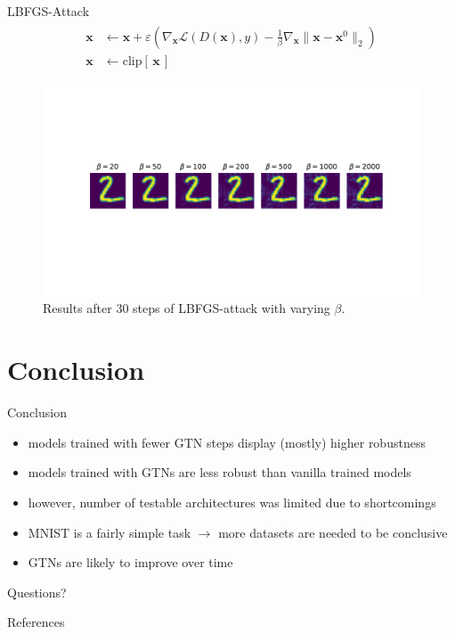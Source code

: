 \documentclass[10pt,usenames,dvipsnames]{beamer}
\renewcommand\vec[1]{\boldsymbol{\mathbf {#1}}}
\newcommand\doubleminipage[2]{
\begin{figure}[H]
\centering
\centerline{
\begin{minipage}{0.5\textwidth}
    \caption*{\footnotesize GTN trained with \texttt{'base\_larger'}}%
    \texttt{[image: figures/base\_larger\_\#1.pdf]}
\end{minipage}%
\begin{minipage}{0.5\textwidth}
    \caption*{\footnotesize GTN trained with \texttt{'base\_larger3'}}%
    \texttt{[image: figures/base\_larger3\_\#1.pdf]}
\end{minipage}
}
\caption{#2%
\label{fig:results_#1}
}
\end{figure}
}
\begin{document}
\begin{frame}{LBFGS-Attack}
    \begin{align*}
    \label{eq:lbfgs}
    \begin{split}
    \vec x &\gets \vec x + \varepsilon \left( \nabla_{\vec x} \mathcal L(D(\vec x), y)
    - \frac 1 \beta \nabla_{\vec x} \| \vec x - \vec x^0 \|_2 \right) \\
    \vec x &\gets \text{clip}[\, \vec x \,]
    \end{split}
    \end{align*}
    
    \begin{figure}[H]
        \centering
        \includegraphics[trim=0 150 0 100, clip, width=\textwidth]{figures/samples_lbfgs.pdf}
        \caption{Results after 30 steps of LBFGS-attack with varying $\beta$.}
        \label{fig:samples_lbfgs}
    \end{figure}
\end{frame}

\section{Conclusion}

\begin{frame}{Conclusion}
    \begin{itemize}
        \item<1-> models trained with fewer GTN steps display
        (mostly) higher robustness
        \item<2-> models trained with GTNs are less robust than
        vanilla trained models
        \item<3-> however, number of testable architectures was limited due to shortcomings
        \item<4-> MNIST is a fairly simple task $\rightarrow$ more datasets are needed to be conclusive
        \item<5-> GTNs are likely to improve over time
    \end{itemize}
    
\end{frame}

{
\begin{frame}[standout]
  Questions?
\end{frame}
}



\begin{frame}[allowframebreaks]{References}
    \printbibliography
\end{frame}
\end{document}
